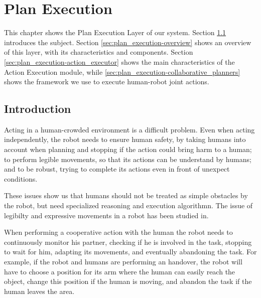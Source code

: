 
\chapter{Plan Execution} %

\label{chapter:plan_execution} %


This chapter shows the Plan Execution Layer of our system. Section \ref{sec:plan_execution-intro} introduces the subject. Section \ref{sec:plan_execution-overview} shows an overview of this layer, with its characteristics and components. Section \ref{sec:plan_execution-action_executor} shows the main characteristics of the Action Execution module, while  \ref{sec:plan_execution-collaborative_planners} shows the framework we use to execute human-robot joint actions.


\section{Introduction}
\label{sec:plan_execution-intro}
Acting in a human-crowded environment is a difficult problem. Even when acting independently, the robot needs to ensure human safety, by taking humans into account when planning and stopping if the action could bring harm to a human; to perform legible movements, so that its actions can be understand by humans; and to be robust, trying to complete its actions even in front of unexpect conditions. 

These issues show us that humans should not be treated as simple obstacles by the robot, but need specialized reasoning and execution algorithmn. The issue of legibilty and expressive movements in a robot has been studied in\cite{dragan2013legibility}.

When performing a cooperative action with the human the robot needs to continuously monitor his partner, checking if he is involved in the task, stopping to wait for him, adapting its movements, and eventually abandoning the task. For example, if the robot and humans are performing an handover, the robot will have to choose a position for its arm where the human can easily reach the object, change this position if the human is moving, and abandon the task if the human leaves the area.

